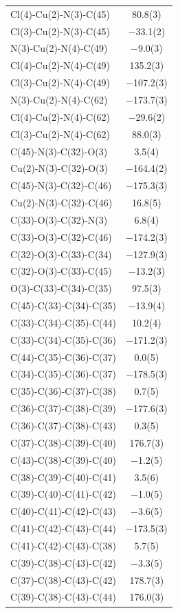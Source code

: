 \begin{center}
{\begin{supertabular}{p{1.8in}c}
Cl(4)-Cu(2)-N(3)-C(45)&80.8(3)\\
Cl(3)-Cu(2)-N(3)-C(45)&$-$33.1(2)\\
N(3)-Cu(2)-N(4)-C(49)&$-$9.0(3)\\
Cl(4)-Cu(2)-N(4)-C(49)&135.2(3)\\
Cl(3)-Cu(2)-N(4)-C(49)&$-$107.2(3)\\
N(3)-Cu(2)-N(4)-C(62)&$-$173.7(3)\\
Cl(4)-Cu(2)-N(4)-C(62)&$-$29.6(2)\\
Cl(3)-Cu(2)-N(4)-C(62)&88.0(3)\\
C(45)-N(3)-C(32)-O(3)&3.5(4)\\
Cu(2)-N(3)-C(32)-O(3)&$-$164.4(2)\\
C(45)-N(3)-C(32)-C(46)&$-$175.3(3)\\
Cu(2)-N(3)-C(32)-C(46)&16.8(5)\\
C(33)-O(3)-C(32)-N(3)&6.8(4)\\
C(33)-O(3)-C(32)-C(46)&$-$174.2(3)\\
C(32)-O(3)-C(33)-C(34)&$-$127.9(3)\\
C(32)-O(3)-C(33)-C(45)&$-$13.2(3)\\
O(3)-C(33)-C(34)-C(35)&97.5(3)\\
C(45)-C(33)-C(34)-C(35)&$-$13.9(4)\\
C(33)-C(34)-C(35)-C(44)&10.2(4)\\
C(33)-C(34)-C(35)-C(36)&$-$171.2(3)\\
C(44)-C(35)-C(36)-C(37)&0.0(5)\\
C(34)-C(35)-C(36)-C(37)&$-$178.5(3)\\
C(35)-C(36)-C(37)-C(38)&0.7(5)\\
C(36)-C(37)-C(38)-C(39)&$-$177.6(3)\\
C(36)-C(37)-C(38)-C(43)&0.3(5)\\
C(37)-C(38)-C(39)-C(40)&176.7(3)\\
C(43)-C(38)-C(39)-C(40)&$-$1.2(5)\\
C(38)-C(39)-C(40)-C(41)&3.5(6)\\
C(39)-C(40)-C(41)-C(42)&$-$1.0(5)\\
C(40)-C(41)-C(42)-C(43)&$-$3.6(5)\\
C(41)-C(42)-C(43)-C(44)&$-$173.5(3)\\
C(41)-C(42)-C(43)-C(38)&5.7(5)\\
C(39)-C(38)-C(43)-C(42)&$-$3.3(5)\\
C(37)-C(38)-C(43)-C(42)&178.7(3)\\
C(39)-C(38)-C(43)-C(44)&176.0(3)\\

\end{supertabular}}
\end{center}
